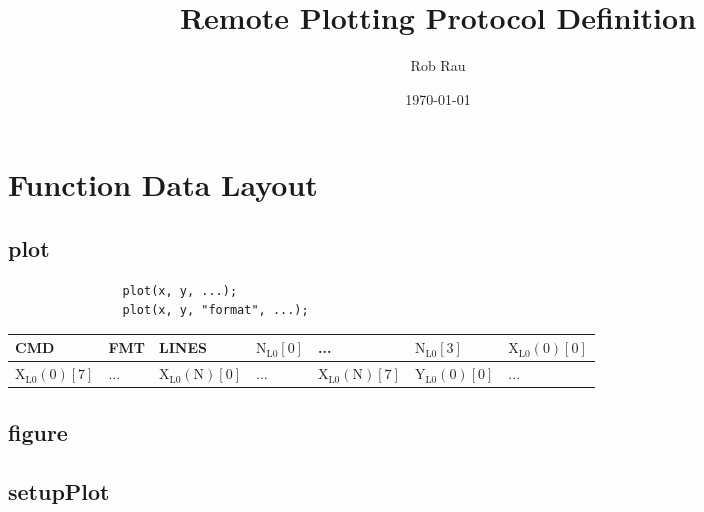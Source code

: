\documentclass[12pt,parskip=full]{article}
\numberwithin{subsection}{section}
\begin{document}
	\vspace{-4ex}
	\title{Remote Plotting Protocol Definition\vspace{-3.5ex}}
	\author{Rob Rau\vspace{-4ex}}
	\date{\today\vspace{-4ex}}
	\maketitle
	
	\section{Function Data Layout}
	
		\subsection{plot}
			\begin{lstlisting}
				plot(x, y, ...);
				plot(x, y, "format", ...);
			\end{lstlisting}

			\begin{centering}
				\begin{tabular}{| C{1.6cm} | C{1.6cm} | C{1.6cm} | C{1.6cm} | C{1.6cm} | C{1.6cm} | C{1.6cm} |}
					\hline
					CMD & FMT & LINES & $\mathrm{N_{L0}[0]}$ & ... & $\mathrm{N_{L0}[3]}$ & $\mathrm{X_{L0}(0)[0]}$ \\ 
					\hline
					$\mathrm{X_{L0}(0)[7]}$ & ... & $\mathrm{X_{L0}(N)[0]}$ & ... & $\mathrm{X_{L0}(N)[7]}$ & $\mathrm{Y_{L0}(0)[0]}$ & ... \\
					\hline
				\end{tabular}
			\end{centering}
		\subsection{figure}
		\subsection{setupPlot}
\end{document}
